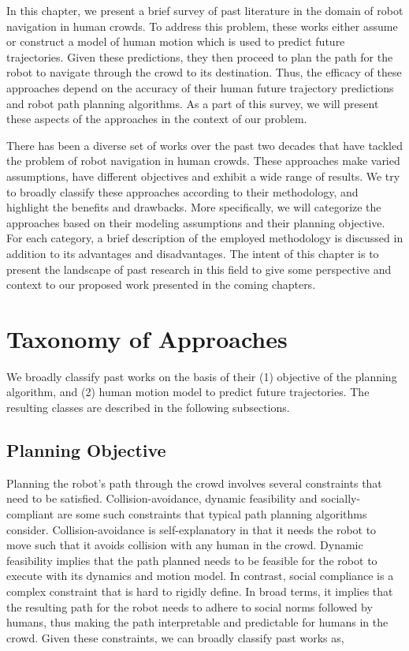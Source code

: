 In this chapter, we present a brief survey of past literature in the domain of robot navigation in human crowds. To address this problem, these works either assume or construct a model of human motion which is used to predict future trajectories. Given these predictions, they then proceed to plan the path for the robot to navigate through the crowd to its destination. Thus, the efficacy of these approaches depend on the accuracy of their human future trajectory predictions and robot path planning algorithms. As a part of this survey, we will present these aspects of the approaches in the context of our problem.

There has been a diverse set of works over the past two decades that have tackled the problem of robot navigation in human crowds. These approaches make varied assumptions, have different objectives and exhibit a wide range of results. We try to broadly classify these approaches according to their methodology, and highlight the benefits and drawbacks. More specifically, we will categorize the approaches based on their modeling assumptions and their planning objective. For each category, a brief description of the employed methodology is discussed in addition to its advantages and disadvantages. The intent of this chapter is to present the landscape of past research in this field to give some perspective and context to our proposed work presented in the coming chapters.

\section{Taxonomy of Approaches}
\label{sec:survey-taxonomy-approaches}

We broadly classify past works on the basis of their (1) objective of the planning algorithm, and (2) human motion model to predict future trajectories. The resulting classes are described in the following subsections.

\subsection{Planning Objective}
\label{sec:survey-planning-objective}
Planning the robot's path through the crowd involves several constraints that need to be satisfied. Collision-avoidance, dynamic feasibility and socially-compliant are some such constraints that typical path planning algorithms consider. Collision-avoidance is self-explanatory in that it needs the robot to move such that it avoids collision with any human in the crowd. Dynamic feasibility implies that the path planned needs to be feasible for the robot to execute with its dynamics and motion model. In contrast, social compliance is a complex constraint that is hard to rigidly define. In broad terms, it implies that the resulting path for the robot needs to adhere to social norms followed by humans, thus making the path interpretable and predictable for humans in the crowd. Given these constraints, we can broadly classify past works as,

